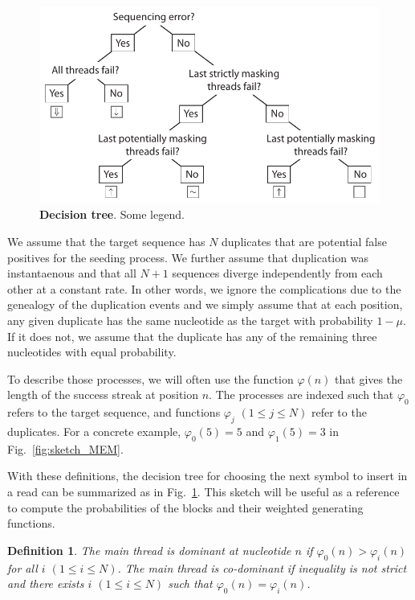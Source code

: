 \documentclass{article}
\newtheorem{definition}{Definition}
\begin{document}
\begin{figure}[h]
\centering
\includegraphics[scale=.7]{decision_tree.pdf}
\caption{\textbf{Decision tree}. 
Some legend.}
\label{fig:decision_tree}
\end{figure}


We assume that the target sequence has $N$ duplicates that are potential
false positives for the seeding process. We further assume that
duplication was instantaenous and that all $N+1$ sequences diverge
independently from each other at a constant rate. In other words, we
ignore the complications due to the genealogy of the duplication events
and we simply assume that at each position, any given duplicate has the
same nucleotide as the target with probability $1-\mu$. If it does not,
we assume that the duplicate has any of the remaining three
nucleotides with equal probability.

To describe those processes, we will
often use the function $\varphi(n)$ that gives the length of the success
streak at position $n$. The processes are indexed such that $\varphi_0$
refers to the target sequence, and functions $\varphi_j$ $(1 \leq j \leq
N)$ refer to the duplicates. For a concrete example, $\varphi_0(5) = 5$
and $\varphi_1(5) = 3$ in Fig.~\ref{fig:sketch_MEM}.



With these definitions, the decision tree for choosing the next symbol to
insert in a read can be summarized as in Fig.~\ref{fig:decision_tree}.
This sketch will be useful as a reference to compute the probabilities of
the blocks and their weighted generating functions.




\begin{definition}
The main thread is dominant at nucleotide $n$ if $\varphi_0(n) >
\varphi_i(n)$ for all $i$ $(1 \leq i \leq N)$. The main thread is
co-dominant if inequality is not strict and there exists $i$ $(1\leq i
\leq N)$ such that $\varphi_0(n) = \varphi_i(n)$.
\end{definition}
\end{document}
